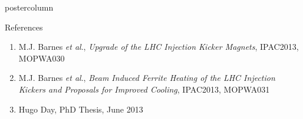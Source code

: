 \documentclass[final,hyperref={pdfpagelabels=false}]{beamer}
\begin{document}
\begin{frame}
\begin{columns}
\begin{column}{.49\textwidth}
\begin{beamercolorbox}[center,wd=\textwidth]{postercolumn}
\begin{minipage}[T]{.95\textwidth}
{\vfill
\begin{block}{References}
\begin{enumerate}
\item{\small{M.J. Barnes \emph{et al}., \emph{Upgrade of the LHC Injection Kicker Magnets}, IPAC2013, MOPWA030}}
\item{\small{M.J. Barnes \emph{et al}., \emph{Beam Induced Ferrite Heating of the LHC Injection Kickers and Proposals for Improved Cooling}, IPAC2013, MOPWA031}}
\item{\small{Hugo Day, PhD Thesis, June 2013}}
\end{enumerate}
\end{block}
         \vfill
          }
        \end{minipage}
      \end{beamercolorbox}
    \end{column}


\end{columns}
\end{frame}
\end{document}
